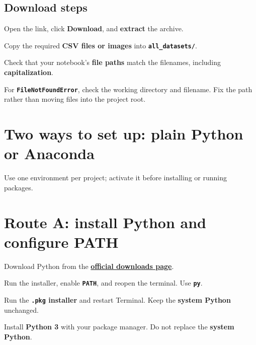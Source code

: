 \subsection{Download steps}

\begin{mlsteps}
  \item Open the link, click \textbf{Download}, and \textbf{extract} the archive.
  \item Copy the required \textbf{CSV files or images} into \textbf{\texttt{all\_datasets/}}.
  \item Check that your notebook's \textbf{file paths} match the filenames, including \textbf{capitalization}.
\end{mlsteps}

\begin{pitfall}
For \textbf{\texttt{FileNotFoundError}}, check the working directory and filename. Fix the path rather than moving files into the project root.
\end{pitfall}

\section{Two ways to set up: plain Python or Anaconda}

\begin{keyidea}
Use one environment per project; activate it before installing or running packages.
\end{keyidea}

\section{Route A: install Python and configure PATH}

Download Python from the \href{https://www.python.org/downloads/}{\textbf{official downloads page}}.

\begin{description}[leftmargin=1.15in,style=nextline]
  \item[Windows] Run the installer, enable \textbf{\texttt{PATH}}, and reopen the terminal. Use \textbf{\texttt{py}}.
  \item[macOS] Run the \textbf{\texttt{.pkg} installer} and restart Terminal. Keep the \textbf{system Python} unchanged.
  \item[Linux] Install \textbf{Python 3} with your package manager. Do not replace the \textbf{system Python}.
\end{description}

